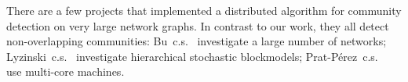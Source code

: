 \begin{comment}
Since our SG-MCMC algorithm is completely different from deep-learning
algorithms, it makes no real sense to compare to the learning frameworks
Theano, Caffe, cuDNN, or NVidia Digits, even though they target GPUs.

SG-MCMC work NOT on GPUs:

GPU work:
MCMC Hamiltonian:
	1. Andrew L. Beam, Sujit K. Ghosh, Jon Doyle
		Fast Hamiltonian Monte Carlo Using GPU Computing
		http://arxiv.org/pdf/1402.4089.pdf
MMSB tensor:

MCMC (not SG):
    1. Alan Medlar, Dorota Głowacka, Horia Stanescu, Kevin Bryson, Robert Kleta
       SwiftLink: Parallel MCMC linkage analysis utilising multicore CPU and GPU
       http://bioinformatics.oxfordjournals.org/content/early/2012/12/13/bioinformatics.bts704.full.pdf
    2. Marc Suchard, Chris Holmes, Mike West
       Some of the What?, Why?, How?, Who?  and Where?  of Graphics Processing Unit Computing for Bayesian Analysis
       https://stat.duke.edu/gpustatsci/GPU-ISBABull2010.pdf
\end{comment}

\begin{comment}
In this paper, we describe our custom RDMA DKV (Distributed Key-Value)
store. Current RMDA DKV store implementations are RamCloud~\cite{RamCloud},
Pilaf~\cite{Pilaf}, Herd~\cite{Herd} and FaRM~\cite{FaRM}. All these systems
use RDMA to implement a DKV store. However, all of them are far more powerful
than our custom implementation -- and this power comes at a cost that we
can avoid. They implement a generic DKV store that controls concurrency,
supports dynamic inserts and deletes, supports variable-sized values
(whose size may change at an update), and keys of arbitrary type. Because
of the nature of our distributed algorithm, we have to deal with none of
these issues. For us, values are fixed-size, allocated only at the initial
population, and remain alive forever. We have no concurrency between writes
and reads or other writes. Our keys are a contiguous range of integers. All
these properties together allow an extremely low-overhead implementation
that does not involve the remote host in any transaction.
\end{comment}

There are a few projects that implemented a distributed algorithm
for community detection on very large network graphs. In contrast to our work,
they all detect non-overlapping communities: Bu~c.s.~\cite{Bu2013246} investigate a
large number of networks; Lyzinski~c.s.~\cite{2015arXiv150302115L} investigate hierarchical
stochastic blockmodels; Prat-P{\'e}rez~c.s.~\cite{Prat-Perez:2014:HQS:2566486.2568010} use
multi-core machines.

